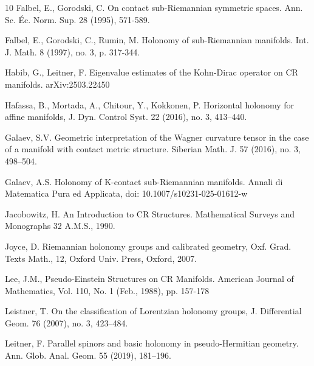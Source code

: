 \documentclass{amsart}
\theoremstyle{plain}
\theoremstyle{definition}
\newcommand{\1}{\mathbf{1}}
\newcommand{\+}{\oplus}
\begin{document}
\begin{thebibliography}{10}
 Falbel, E., Gorodski, C. On contact  sub-Riemannian symmetric spaces. 
Ann. Sc. \'Ec. Norm. Sup. 28 (1995), 571-589.	
	
 Falbel, E., Gorodski, C., Rumin, M. Holonomy of sub-Riemannian manifolds.
Int. J. Math. 8 (1997), no. 3, p. 317-344.

 Habib, G., Leitner, F. \newblock  Eigenvalue estimates of the Kohn-Dirac operator
on CR manifolds. \newblock arXiv:2503.22450     

Hafassa, B.,  Mortada, A.,   Chitour, Y.,  Kokkonen, P. Horizontal holonomy
for affine manifolds, J. Dyn. Control Syst. 22 (2016), no. 3,  413--440.


 Galaev, S.V. 	Geometric interpretation of the Wagner curvature tensor in the case of a manifold with contact metric structure.
Siberian Math. J. 
57 (2016), no. 3, 498--504.


 Galaev, A.S. Holonomy of K-contact sub-Riemannian manifolds. Annali di Matematica Pura ed Applicata, doi: 10.1007/s10231-025-01612-w 




 Jacobowitz, H.  An Introduction to CR Structures. Mathematical Surveys and Monographs 32 A.M.S., 1990.

  Joyce, D. Riemannian holonomy groups and calibrated geometry, Oxf. Grad. Texts
Math., 12, Oxford Univ. Press, Oxford, 2007.

 Lee, J.M., Pseudo-Einstein Structures on CR Manifolds. 
American Journal of Mathematics, Vol. 110, No. 1 (Feb., 1988), pp. 157-178



 Leistner, T.  On the classification of Lorentzian holonomy
	groups, J.  Differential Geom.  76 (2007), no. 3, 423--484.





 Leitner, F. Parallel spinors and basic holonomy in pseudo-Hermitian geometry.  Ann. Glob. Anal. Geom. 55 (2019), 181–196.


\end{thebibliography}
\end{document}
